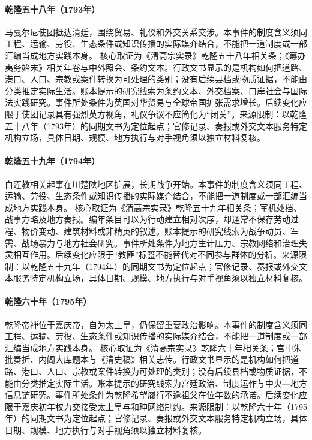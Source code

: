 \hypertarget{civic:EQ-1793-MACARTNEY-MISSION}{}\paragraph{乾隆五十八年（1793年）}马戛尔尼使团抵达清廷，围绕贸易、礼仪和外交关系交涉。本事件的制度含义须同工程、运输、劳役、生态条件或知识传播的实际媒介结合，不能把一道制度或一部汇编当成地方实践本身。 核心取证为《清高宗实录》乾隆五十八年相关条；《筹办夷务始末》相关年卷与中外照会、条约文本。行政文书显示的是机构如何把道路、港口、人口、宗教或案件转换为可处理的类别；没有后续县档或物质证据，不能由分类推定实际生活。账本提示的研究线索为条约文本、外交档案、口岸社会与国际法实践研究。事件所处条件为英国对华贸易与全球帝国扩张需求增长。后续变化应限于使团记录具有强烈英方视角，礼仪争议不应简化为“闭关”。来源限制：以乾隆五十八年（1793年）的同期文书为定位起点；官修记录、奏报或外交文本服务特定机构立场，具体日期、规模、地方执行与对手视角须以独立材料复核。
\hypertarget{civic:EQ-1794-WHITE-LOTUS-OUTBREAK}{}\paragraph{乾隆五十九年（1794年）}白莲教相关起事在川楚陕地区扩展，长期战争开始。本事件的制度含义须同工程、运输、劳役、生态条件或知识传播的实际媒介结合，不能把一道制度或一部汇编当成地方实践本身。 核心取证为《清高宗实录》乾隆五十九年相关条；军机处档、战事方略及地方奏报。编年条目可以为行动建立相对次序，却通常不保存劳动过程、物价变动、建筑材料或非精英的叙述。账本提示的研究线索为战争动员、军需、战场暴力与地方社会研究。事件所处条件为地方生计压力、宗教网络和治理失灵相互作用。后续变化应限于“教匪”标签不能替代对不同参与群体的分析。来源限制：以乾隆五十九年（1794年）的同期文书为定位起点；官修记录、奏报或外交文本服务特定机构立场，具体日期、规模、地方执行与对手视角须以独立材料复核。
\hypertarget{civic:EQ-1795-QIANLONG-ABDICATION}{}\paragraph{乾隆六十年（1795年）}乾隆帝禅位于嘉庆帝，自为太上皇，仍保留重要政治影响。本事件的制度含义须同工程、运输、劳役、生态条件或知识传播的实际媒介结合，不能把一道制度或一部汇编当成地方实践本身。 核心取证为《清高宗实录》乾隆六十年相关条；宫中朱批奏折、内阁大库题本与《清史稿》相关志传。行政文书显示的是机构如何把道路、港口、人口、宗教或案件转换为可处理的类别；没有后续县档或物质证据，不能由分类推定实际生活。账本提示的研究线索为宫廷政治、制度运作与中央—地方信息链研究。事件所处条件为乾隆希望履行不逾祖父在位年数的承诺。后续变化应限于嘉庆初年权力交接受太上皇与和珅网络制约。来源限制：以乾隆六十年（1795年）的同期文书为定位起点；官修记录、奏报或外交文本服务特定机构立场，具体日期、规模、地方执行与对手视角须以独立材料复核。
